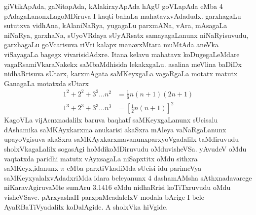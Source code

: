 giVtikApAda, gaNitapAda, kAlakirxyApAda hAgU goVLapAda eMba {\rm 4} pAdagaLanonxLagoMDiruva I kaqti bahaLa mahatavxvAdadudx. garxhagaLu sututxva vidhAna, kAla\-niNaRya, yugagaLu parxmANa, vAra, mAsagaLa niNaRya, garxhaNa, sUyoVRdaya sUyARsatx samayagaLanunx niNaRyisuvudu, garxhagaLu goVcarisuva riVti kalapx manavxM\-tara muMtAda aneVka viSayagaLa bagegx vivarisidAdxre. Itana kelavu mahatavx koDugegaLeMdare vagaRsamiVkaraNakekx saMbaMdhisida lekakxgaLu. asalina meVlina baDiDx nidhaRrisuva sUtarx, karxmAgata saMKeyxgaLa vagaRgaLa motatx matutx GanagaLa motatxda sUtarx
\begin{align*}
1^{2}+2^{2}+3^{2}\ldots n^{2}&
=\frac{1}{6}n(n+1)(2n+1)\\
1^{3}+2^{3}+3^{3}\ldots n^{3} &
=\left[\frac{1}{2}n(n+1)\right]^{2}
\end{align*}
KagoVLa vijAcnxnadalilx baruva baqhatf saMKeyxgaLanunx sUcisalu dAshamika saMKAyxkarxma anukarisi akaSxra mAleya vaNaRgaLanunx upayoVgisuva akaSxra saMKAyxkarxmavanunx\break parxyoVgadalilx taMdiruvudu sholxVkagaLalilx sogasAgi hoMdikoMDiruvudu oMdu\break visheVSa. yAvudeV oMdu vaqtatxda paridhi matutx vAyxsagaLa niSapxtitx oMdu sithxra saMKeyx,\break idanunx $\pi$ eMba parxtiVkadiMda sUcisi idu parimeVya saMKeyxyalalxvAdadxriMda idara beleyanunx {\rm 4} dashamAMsha sAthxnadavarege niKaravAgiruvaMte sumAru {\rm 3.1416} eMdu nidhaRrisi koTiTxruvudu oMdu visheVSave. pArxyashaH parxpaMcadalelxV modala bArige I bele AyaRBaTiVyadalilx koDalAgide. A sholxVka hiVgide.
 
